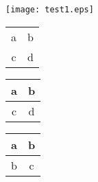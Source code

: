 \documentclass{article}
\begin{document}
\begin{center}
\texttt{[image: test1.eps]}
\end{center}


\begin{tabular}{|c|c|}
a & b \\
c & d\\
\end{tabular}

\begin{tabular}{|c|c|}
\hline
a & b \\
\hline
c & d \\
\hline 
\end{tabular}


\begin{center}
\begin{tabular}{|c|c|}
\hline
a&b\\ \hline
b&c\\ \hline
\hline
\end{tabular}
\end{center}
\end{document}
